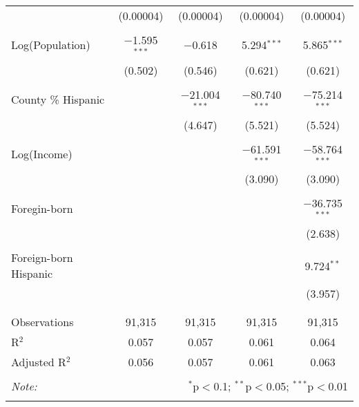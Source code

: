 \begin{table}[!htbp]
\begin{tabular}{@{\extracolsep{-5pt}}lcccc}
  & (0.00004) & (0.00004) & (0.00004) & (0.00004) \\ 
  & & & & \\ 
 Log(Population) & $-$1.595$^{***}$ & $-$0.618 & 5.294$^{***}$ & 5.865$^{***}$ \\ 
  & (0.502) & (0.546) & (0.621) & (0.621) \\ 
  & & & & \\ 
 County \% Hispanic &  & $-$21.004$^{***}$ & $-$80.740$^{***}$ & $-$75.214$^{***}$ \\ 
  &  & (4.647) & (5.521) & (5.524) \\ 
  & & & & \\ 
 Log(Income) &  &  & $-$61.591$^{***}$ & $-$58.764$^{***}$ \\ 
  &  &  & (3.090) & (3.090) \\ 
  & & & & \\ 
 Foregin-born &  &  &  & $-$36.735$^{***}$ \\ 
  &  &  &  & (2.638) \\ 
  & & & & \\ 
 Foreign-born Hispanic &  &  &  & 9.724$^{**}$ \\ 
  &  &  &  & (3.957) \\ 
  & & & & \\ 
\hline \\[-1.8ex] 
Observations & 91,315 & 91,315 & 91,315 & 91,315 \\ 
R$^{2}$ & 0.057 & 0.057 & 0.061 & 0.064 \\ 
Adjusted R$^{2}$ & 0.056 & 0.057 & 0.061 & 0.063 \\ 
\hline 
\hline \\[-1.8ex] 
\textit{Note:}  & \multicolumn{4}{r}{$^{*}$p$<$0.1; $^{**}$p$<$0.05; $^{***}$p$<$0.01} \\ 
 & \multicolumn{4}{r}{} \\ 
\end{tabular} 
\end{table} 
